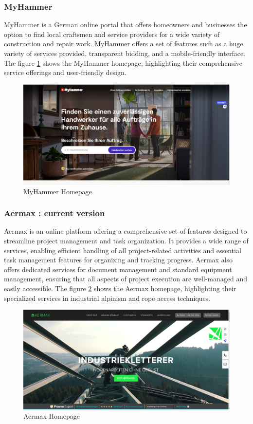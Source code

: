 \subsubsection*{MyHammer  \cite{MyHammer}}
MyHammer is a German online portal that offers homeowners and businesses the option to find local craftsmen and service providers for a wide variety of construction and repair work. MyHammer offers a set of features such as a huge variety of services provided, transparent bidding, and a mobile-friendly interface. The figure \ref{fig:myhammer_image} shows the MyHammer homepage, highlighting their comprehensive service offerings and user-friendly design.
\begin{figure}[H]
    \centering
    \includegraphics[width=\linewidth]{src/assets/chapters/myHammer.PNG}
    \caption{MyHammer Homepage}
    \label{fig:myhammer_image}
\end{figure}

\subsubsection*{Aermax : current version \cite{Aermax}}
Aermax is an online platform offering a comprehensive set of features designed to streamline project management and task organization. It provides a wide range of services, enabling efficient handling of all project-related activities and essential task management features for organizing and tracking progress. Aermax also offers dedicated services for document management and standard equipment management, ensuring that all aspects of project execution are well-managed and easily accessible. The figure \ref{fig:aermax_image} shows the Aermax homepage, highlighting their specialized services in industrial alpinism and rope access techniques.
\begin{figure}[H]
    \centering
    \includegraphics[width=\linewidth]{src/assets/images/aermax.PNG}
    \caption{Aermax Homepage}
    \label{fig:aermax_image}
\end{figure}

